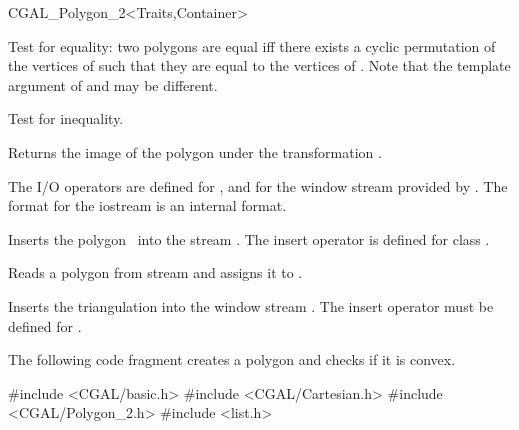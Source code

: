 \begin{ccClassTemplate}{CGAL_Polygon_2<Traits,Container>}

     { Test for equality: two polygons are equal iff there exists a cyclic
       permutation of the vertices of  such that they are equal to the
       vertices of . Note that the template argument
        of  and  may be different. }

     { Test for inequality. }

  { Returns the image of the polygon  under the transformation . }


The I/O operators are defined for , and for
the window stream provided by \cgal. The format for the iostream
is an internal format.

     { Inserts the polygon \ccVar\ into the stream .
       \ccPrecond The insert operator is defined for class .}

     { Reads a polygon from stream  and assigns it
       to \ccVar.}


{
Inserts the triangulation  into the window stream .
The insert operator must be defined for .
}

\ccExample

The following code fragment creates a polygon and checks if it is convex.

\begin{cprog}
#include <CGAL/basic.h>
#include <CGAL/Cartesian.h>
#include <CGAL/Polygon_2.h>
#include <list.h>


\end{cprog}
\end{ccClassTemplate}
